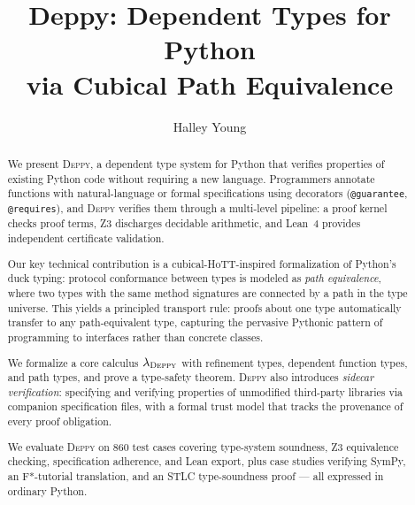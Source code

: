 \documentclass[acmsmall,nonacm,screen]{acmart}
\newcommand{\deppy}{\textsc{Deppy}}
\begin{document}

\title{Deppy: Dependent Types for Python \\ via Cubical Path Equivalence}

\author{Halley Young}

\begin{abstract}
We present \deppy{}, a dependent type system for Python that verifies
properties of existing Python code without requiring a new language.
Programmers annotate functions with natural-language or formal
specifications using decorators (\texttt{@guarantee},
\texttt{@requires}), and \deppy{} verifies them through a multi-level
pipeline: a proof kernel checks proof terms, Z3 discharges decidable
arithmetic, and Lean~4 provides independent certificate validation.

Our key technical contribution is a cubical-HoTT-inspired
formalization of Python's duck typing: protocol conformance between
types is modeled as \emph{path equivalence}, where two types with the
same method signatures are connected by a path in the type universe.
This yields a principled transport rule: proofs about one type
automatically transfer to any path-equivalent type, capturing the
pervasive Pythonic pattern of programming to interfaces rather than
concrete classes.

We formalize a core calculus $\lambda_{\deppy}$ with refinement
types, dependent function types, and path types, and prove a
type-safety theorem.  \deppy{} also introduces \emph{sidecar
  verification}: specifying and verifying properties of unmodified
third-party libraries via companion specification files, with a formal
trust model that tracks the provenance of every proof obligation.

We evaluate \deppy{} on 860 test cases covering type-system
soundness, Z3 equivalence checking, specification adherence, and Lean
export, plus case studies verifying SymPy, an F*-tutorial translation,
and an STLC type-soundness proof --- all expressed in ordinary Python.
\end{abstract}

\maketitle
\end{document}
